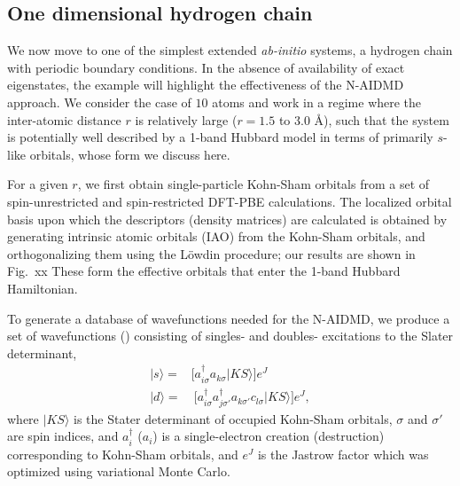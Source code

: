 \subsection{One dimensional hydrogen chain}
We now move to one of the simplest extended \emph{ab-initio} systems, a hydrogen chain with periodic boundary conditions. 
In the absence of availability of exact eigenstates, the example will highlight the effectiveness of the N-AIDMD approach.
We consider the case of $10$ atoms and work in a regime where the inter-atomic distance $r$ is 
relatively large ($r=1.5$ to $3.0$ \AA), such that the system is potentially well described by a 1-band Hubbard model 
in terms of primarily $s$-like orbitals, whose form we discuss here. 

For a given $r$, we first obtain single-particle Kohn-Sham orbitals from a set of spin-unrestricted and 
spin-restricted DFT-PBE calculations. The localized orbital basis upon which the descriptors (density matrices) 
are calculated is obtained by generating intrinsic atomic orbitals (IAO) from the Kohn-Sham orbitals, and orthogonalizing them using 
the L\"owdin procedure; our results are shown in Fig.~xx 
These form the effective orbitals that enter the 1-band Hubbard Hamiltonian. 

To generate a database of wavefunctions needed for the N-AIDMD, 
we produce a set of wavefunctions () consisting of singles- and doubles- excitations 
to the Slater determinant, 
\begin{subequations}
\begin{eqnarray}
| s \rangle = & \Big[a^\dagger_{i \sigma} a_{k \sigma}   | KS \rangle \Big]e^J \\
| d \rangle = & \: \Big[a^\dagger_{i \sigma} a^\dagger_{j \sigma'} a_{k \sigma'} c_{l \sigma}   | KS \rangle\Big]e^J ,
\end{eqnarray}
\end{subequations}
where $|KS\rangle$ is the Stater determinant of occupied Kohn-Sham orbitals, $\sigma$ and $\sigma'$ are spin indices, 
and $a_{i}^\dagger$ ($a_{i}$) is a single-electron creation (destruction) corresponding to Kohn-Sham orbitals, 
and $e^J$ is the Jastrow factor which was optimized using variational Monte Carlo. 

